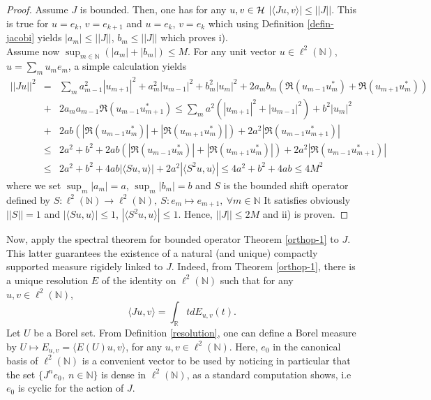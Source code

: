 \documentclass[a4paper]{jpconf}
\numberwithin{equation}{section}
\theoremstyle{nonumberplain}
\newtheorem{proof}{Proof}
\begin{document}
\begin{proof}
Assume $J$ is bounded. Then, one has for any $u,v\in\cal{H}$ $|\langle Ju,v \rangle|\le ||J||$. This is true for $u=e_k$, $v=e_{k+1}$ and $u=e_k$, $v=e_k$ which using Definition \ref{defin-jacobi} yields $|a_m|\le||J||$, $b_m\le||J||$ which proves i). \\
Assume now $\sup_{m\in\mathbb{N}}(|a_m|+|b_m|)\le M$. For any unit vector $u\in\ell^2(\mathbb{N})$, $u=\sum_mu_me_m$, a simple calculation yields
\begin{eqnarray}
||Ju||^2&=&\sum_ma^2_{m-1}|u_{m+1}|^2+a^2_m|u_{m-1}|^2+b^2_m|u_m|^2+2a_mb_m(\Re(u_{m-1}u^*_m)+\Re(u_{m+1}u^*_m))\nonumber\\
&+&2a_ma_{m-1}\Re(u_{m-1}u^*_{m+1})\le\sum_ma^2(|u_{m+1}|^2+|u_{m-1}|^2)+b^2|u_m|^2\nonumber\\
&+&2ab(|\Re(u_{m-1}u^*_m)|+|\Re(u_{m+1}u^*_m)|)+2a^2|\Re(u_{m-1}u^*_{m+1})|\nonumber\\
&\le&2a^2+b^2+2ab(|\Re(u_{m-1}u^*_m)|+|\Re(u_{m+1}u^*_m)|)+2a^2|\Re(u_{m-1}u^*_{m+1})|\nonumber\\
&\le&2a^2+b^2+4ab|\langle Su,u \rangle|+2a^2|\langle S^2u,u\rangle|\le4a^2+b^2+4ab\le4M^2
\label{sum-ju-maj}
\end{eqnarray}
where we set $\sup_m|a_m|=a$, $\sup_m|b_m|=b$ and $S$ is the bounded shift operator defined by $
S:\ell^2(\mathbb{N})\to\ell^2(\mathbb{N}),\ S:e_m\mapsto e_{m+1},\ \forall m\in\mathbb{N}$
It satisfies obviously $||S||=1$ and $|\langle Su,u\rangle|\le1$, $|\langle S^2u,u \rangle|\le1$. Hence, $||J||\le2M$ and ii) is proven.
\end{proof} 
Now, apply the spectral theorem for bounded operator Theorem \ref{orthop-1} to $J$. This latter guarantees the existence of a natural (and unique) compactly supported measure rigidely linked to $J$. Indeed, from Theorem \ref{orthop-1}, there is a unique resolution $E$ of the identity on $\ell^2(\mathbb{N})$ such that for any $u,v\in\ell^2(\mathbb{N})$, 
\begin{equation}
\langle Ju,v \rangle=\int_\mathbb{R}tdE_{u,v}(t). 
\end{equation}
Let $U$ be a Borel set. From Definition \ref{resolution}, one can define a Borel measure by $U\mapsto E_{u,v}=\langle E(U)u,v \rangle$, for any $u,v\in\ell^2(\mathbb{N})$. Here, $e_0$ in the canonical basis of $\ell^2(\mathbb{N})$ is a convenient vector to be used by noticing in particular that the set $\{J^ne_0,\ n\in\mathbb{N}\}$ is dense in $\ell^2(\mathbb{N})$, as a standard computation shows, i.e $e_0$ is cyclic for the action of $J$.
\end{document}
